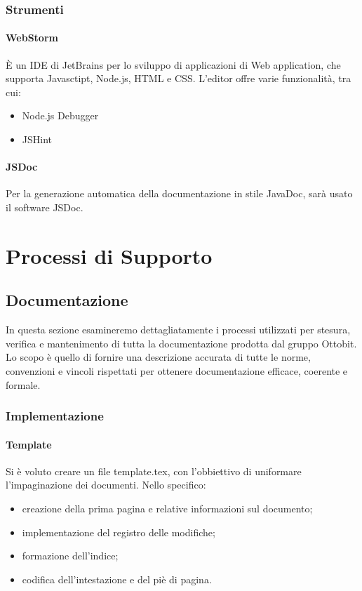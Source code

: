 \documentclass[11pt,a4paper]{article}
\begin{document}
{	\subsubsection{Strumenti}
	\paragraph{WebStorm\\} 
	È un IDE di JetBrains per lo sviluppo di applicazioni di Web application, che supporta Javasctipt, Node.js, HTML e CSS.
	L'editor offre varie funzionalità, tra cui:
	\begin{itemize}
		\item Node.js Debugger
		\item JSHint
	\end{itemize}

	\paragraph{JSDoc\\}
	Per la generazione automatica della documentazione in stile JavaDoc, sarà usato il software JSDoc.
	
	
		\section{Processi di Supporto}
	\subsection{Documentazione}
	In questa sezione esamineremo dettagliatamente i processi utilizzati per stesura, verifica e mantenimento di tutta la documentazione prodotta dal gruppo Ottobit.
	Lo scopo è quello di fornire una descrizione accurata di tutte le norme, convenzioni e vincoli rispettati per ottenere documentazione efficace, coerente e formale.
	\subsubsection{Implementazione}
	
	\paragraph{Template\\}
	Si è voluto creare un file template.tex, con l'obbiettivo di uniformare l'impaginazione dei documenti. 
	Nello specifico:
	\begin{itemize}
		\item{creazione della prima pagina e relative informazioni sul documento;}
		\item{implementazione del registro delle modifiche;}
		\item{formazione dell'indice;}
		\item {codifica dell'intestazione e del piè di pagina.}
		

\end{itemize}}
\end{document}
